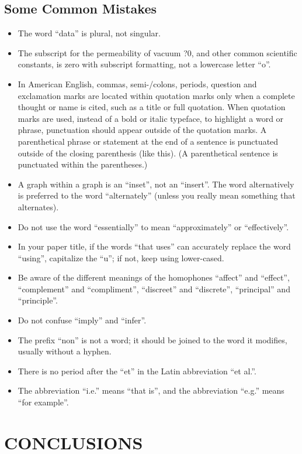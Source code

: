 \documentclass[letterpaper, 10 pt, conference]{ieeeconf}  %
\begin{document}
\subsection{Some Common Mistakes}
\begin{itemize}


\item The word ``data'' is plural, not singular.
\item The subscript for the permeability of vacuum ?0, and other common scientific constants, is zero with subscript formatting, not a lowercase letter ``o''.
\item In American English, commas, semi-/colons, periods, question and exclamation marks are located within quotation marks only when a complete thought or name is cited, such as a title or full quotation. When quotation marks are used, instead of a bold or italic typeface, to highlight a word or phrase, punctuation should appear outside of the quotation marks. A parenthetical phrase or statement at the end of a sentence is punctuated outside of the closing parenthesis (like this). (A parenthetical sentence is punctuated within the parentheses.)
\item A graph within a graph is an ``inset'', not an ``insert''. The word alternatively is preferred to the word ``alternately'' (unless you really mean something that alternates).
\item Do not use the word ``essentially'' to mean ``approximately'' or ``effectively''.
\item In your paper title, if the words ``that uses'' can accurately replace the word ``using'', capitalize the ``u''; if not, keep using lower-cased.
\item Be aware of the different meanings of the homophones ``affect'' and ``effect'', ``complement'' and ``compliment'', ``discreet'' and ``discrete'', ``principal'' and ``principle''.
\item Do not confuse ``imply'' and ``infer''.
\item The prefix ``non'' is not a word; it should be joined to the word it modifies, usually without a hyphen.
\item There is no period after the ``et'' in the Latin abbreviation ``et al.''.
\item The abbreviation ``i.e.'' means ``that is'', and the abbreviation ``e.g.'' means ``for example''.

\end{itemize}


\section{CONCLUSIONS}
\end{document}
